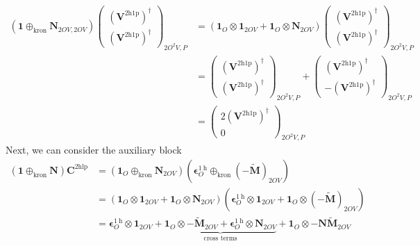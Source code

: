 \begin{align}
    \left( \bm{1} \oplus_{\text{kron}} \bm{N}_{2OV,2OV} \right) \begin{pmatrix}
        \left(\bm{V}^{2\mathrm{h1p}}\right)^{\dagger} \\ \left( \bm{V}^{2\mathrm{h1p}}\right)^{\dagger}
    \end{pmatrix} _{2O^2V,P} &=\left( \bm{1}_O \otimes \bm{1}_{2OV} + \bm{1}_O \otimes \bm{N}_{2OV} \right) \begin{pmatrix}
        \left(\bm{V}^{2\mathrm{h1p}}\right)^{\dagger} \\ \left( \bm{V}^{2\mathrm{h1p}}\right)^{\dagger}
    \end{pmatrix} _{2O^2V,P}\\
& =\begin{pmatrix}
        \left(\bm{V}^{2\mathrm{h1p}}\right)^{\dagger} \\ \left( \bm{V}^{2\mathrm{h1p}}\right)^{\dagger}
    \end{pmatrix} _{2O^2V,P} + \begin{pmatrix}
        \left(\bm{V}^{2\mathrm{h1p}}\right)^{\dagger} \\ -\left( \bm{V}^{2\mathrm{h1p}}\right)^{\dagger}
    \end{pmatrix} _{2O^2V,P} \\
&= \begin{pmatrix}
        2\left(\bm{V}^{2\mathrm{h1p}}\right)^{\dagger} \\ 0
    \end{pmatrix} _{2O^2V,P}
\end{align}
Next, we can consider the auxiliary block
\begin{align}
 \left( \bm{1} \oplus_{\text{kron}} \bm{N} \right)\bm{C}^{2\mathrm{hlp}} &= \left(\bm{1}_{O} \oplus_{\text{kron}} \bm{N}_{2OV}\right) \left( \bm{\epsilon}^{1 \mathrm{~h}}_{O} \oplus_{\text{kron}} (-\bm{\tilde{M}})_{2OV} \right)\\
&= \left( \bm{1}_O \otimes \bm{1}_{2OV} + \bm{1}_O \otimes \bm{N}_{2OV} \right) \left( \bm{\epsilon}^{1 \mathrm{~h}}_{O} \otimes \bm{1}_{2OV} + \bm{1}_{O} \otimes (-\bm{\tilde{M}})_{2OV} \right)\\
&= \bm{\epsilon}^{1 \mathrm{~h}}_O \otimes \bm{1}_{2OV} + \underbrace{\bm{1}_O \otimes -\bm{\tilde{M}}_{2OV} + \bm{\epsilon}^{1 \mathrm{~h}}_O \otimes \bm{N}_{2OV}}_{\text{cross terms}} + \bm{1}_O \otimes -\bm{N}\bm{\tilde{M}}_{2OV}
\end{align}

